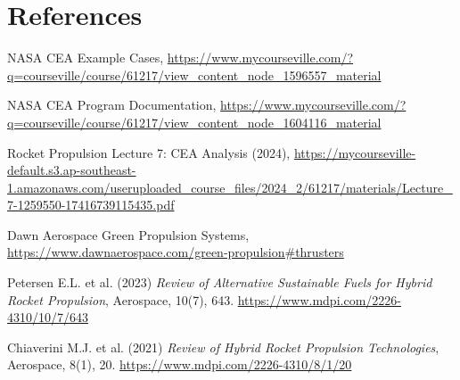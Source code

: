 \documentclass[12pt]{article}
\begin{document}
\section{References}
\begin{thebibliography}{9}
NASA CEA Example Cases, \url{https://www.mycourseville.com/?q=courseville/course/61217/view_content_node_1596557_material}

NASA CEA Program Documentation, \url{https://www.mycourseville.com/?q=courseville/course/61217/view_content_node_1604116_material}

Rocket Propulsion Lecture 7: CEA Analysis (2024), \url{https://mycourseville-default.s3.ap-southeast-1.amazonaws.com/useruploaded_course_files/2024_2/61217/materials/Lecture_7-1259550-17416739115435.pdf}

Dawn Aerospace Green Propulsion Systems, \url{https://www.dawnaerospace.com/green-propulsion#thrusters}

Petersen E.L. et al. (2023) \emph{Review of Alternative Sustainable Fuels for Hybrid Rocket Propulsion}, Aerospace, 10(7), 643. \url{https://www.mdpi.com/2226-4310/10/7/643}

Chiaverini M.J. et al. (2021) \emph{Review of Hybrid Rocket Propulsion Technologies}, Aerospace, 8(1), 20. \url{https://www.mdpi.com/2226-4310/8/1/20}
\end{thebibliography}
\end{document}
